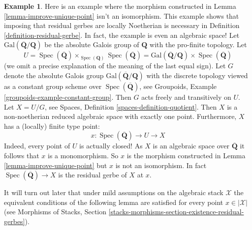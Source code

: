 \documentclass{stacks-project}
\theoremstyle{plain}
\theoremstyle{definition}
\newtheorem{example}[subsection]{Example}
\theoremstyle{remark}
\numberwithin{equation}{subsection}
\def\Spec{\mathop{\mathrm{Spec}}}
\begin{document}
\begin{example}
\label{example-distinct}
Here is an example where the morphism constructed in
Lemma \ref{lemma-improve-unique-point}
isn't an isomorphism. This example shows that imposing
that residual gerbes are locally Noetherian is necessary in
Definition \ref{definition-residual-gerbe}.
In fact, the example is even an algebraic space!
Let $\text{Gal}(\overline{\mathbf{Q}}/\mathbf{Q})$ be the absolute
Galois group of $\mathbf{Q}$ with the pro-finite topology.
Let
$$
U =
\Spec(\overline{\mathbf{Q}})
\times_{\Spec(\mathbf{Q})}
\Spec(\overline{\mathbf{Q}}) =
\text{Gal}(\overline{\mathbf{Q}}/\mathbf{Q}) \times
\Spec(\overline{\mathbf{Q}})
$$
(we omit a precise explanation of the meaning of the last equal sign).
Let $G$ denote the absolute Galois group
$\text{Gal}(\overline{\mathbf{Q}}/\mathbf{Q})$ with the discrete
topology viewed as a constant group scheme over
$\Spec(\overline{\mathbf{Q}})$, see
Groupoids, Example \ref{groupoids-example-constant-group}.
Then $G$ acts freely and transitively on $U$.
Let $X = U/G$, see
Spaces, Definition \ref{spaces-definition-quotient}.
Then $X$ is a non-noetherian reduced algebraic space with exactly one point.
Furthermore, $X$ has a (locally) finite type point:
$$
x :
\Spec(\overline{\mathbf{Q}}) \longrightarrow
U \longrightarrow X
$$
Indeed, every point of $U$ is actually closed!
As $X$ is an algebraic space over $\overline{\mathbf{Q}}$
it follows that $x$ is a monomorphism. So $x$ is the morphism
constructed in
Lemma \ref{lemma-improve-unique-point}
but $x$ is not an isomorphism. In fact
$\Spec(\overline{\mathbf{Q}}) \to X$ is the residual gerbe of $X$ at $x$.
\end{example}

\noindent
It will turn out later that under mild assumptions on the algebraic stack
$\mathcal{X}$ the equivalent conditions of the following lemma are satisfied
for every point $x \in |\mathcal{X}|$ (see Morphisms of Stacks, Section
\ref{stacks-morphisms-section-existence-residual-gerbes}).
\end{document}
